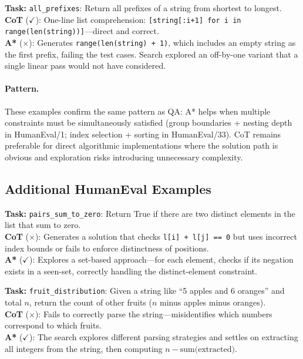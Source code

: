 \documentclass[11pt]{article}
\begin{document}
{{\begin{examplebox}[title=HumanEval/14 --- CoT Correct{,} A* Wrong]
\textbf{Task:} \texttt{all\_prefixes}: Return all prefixes of a string from shortest to longest.\\[4pt]
\textbf{CoT} ($\checkmark$): One-line list comprehension: \texttt{[string[:i+1] for i in range(len(string))]}---direct and correct.\\[4pt]
\textbf{A*} ($\times$): Generates \texttt{range(len(string) + 1)}, which includes an empty string as the first prefix, failing the test cases. Search explored an off-by-one variant that a single linear pass would not have considered.
\end{examplebox}

\paragraph{Pattern.} These examples confirm the same pattern as QA: A* helps when multiple constraints must be simultaneously satisfied (group boundaries + nesting depth in HumanEval/1; index selection + sorting in HumanEval/33). CoT remains preferable for direct algorithmic implementations where the solution path is obvious and exploration risks introducing unnecessary complexity.

\subsection{Additional HumanEval Examples}

\begin{examplebox}[title=HumanEval/43 --- A* Correct{,} CoT Wrong]
\textbf{Task:} \texttt{pairs\_sum\_to\_zero}: Return True if there are two distinct elements in the list that sum to zero.\\[4pt]
\textbf{CoT} ($\times$): Generates a solution that checks \texttt{l[i] + l[j] == 0} but uses incorrect index bounds or fails to enforce distinctness of positions.\\[4pt]
\textbf{A*} ($\checkmark$): Explores a set-based approach---for each element, checks if its negation exists in a seen-set, correctly handling the distinct-element constraint.
\end{examplebox}

\begin{examplebox}[title=HumanEval/67 --- A* Correct{,} CoT Wrong]
\textbf{Task:} \texttt{fruit\_distribution}: Given a string like ``5 apples and 6 oranges'' and total $n$, return the count of other fruits ($n$ minus apples minus oranges).\\[4pt]
\textbf{CoT} ($\times$): Fails to correctly parse the string---misidentifies which numbers correspond to which fruits.\\[4pt]
\textbf{A*} ($\checkmark$): The search explores different parsing strategies and settles on extracting all integers from the string, then computing $n - \text{sum(extracted)}$.
\end{examplebox}

}}
\end{document}
